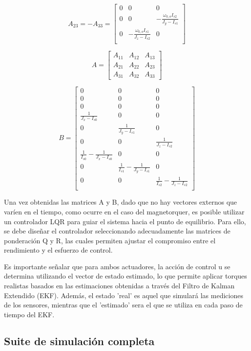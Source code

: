 \[
A_{23} = -A_{33} = 
\begin{bmatrix}
	0 & 0 & 0 \\
	0 & 0 & -\frac{\omega_{0,o} I_{s2}}{J_y - I_{s1}}
	 \\
	0 & -\frac{\omega_{0,o} I_{s1}}{J_z - I_{s2}}
	 & 0 \\
\end{bmatrix}
\]

\[
A =
\begin{bmatrix}
	A_{11} & A_{12} & A_{13} \\
	A_{21} & A_{22} & A_{23} \\
	A_{31} & A_{32} & A_{33}
\end{bmatrix}
\]

\[
B =
\begin{bmatrix}
	0 & 0 & 0 \\
	0 & 0 & 0 \\
	0 & 0 & 0 \\
	\frac{1}{J_{x}-I_{s0}} & 0 & 0 \\
	0 & \frac{1}{J_{y}-I_{s1}} & 0 \\
	0 & 0 & \frac{1}{J_{z}-I_{s2}} \\
	\frac{1}{I_{s0}} - \frac{1}{J_{x}-I_{s0}} & 0 & 0 \\
	0 & \frac{1}{I_{s1}} - \frac{1}{J_{y}-I_{s1}} & 0 \\
	0 & 0 & \frac{1}{I_{s2}} - \frac{1}{J_{z}-I_{s2}} \\
\end{bmatrix}
\]

Una vez obtenidas las matrices A y B, dado que no hay vectores externos que varíen en el tiempo, como ocurre en el caso del magnetorquer, es posible utilizar un controlador LQR para guiar el sistema hacia el punto de equilibrio. Para ello, se debe diseñar el controlador seleccionando adecuadamente las matrices de ponderación Q y R, las cuales permiten ajustar el compromiso entre el rendimiento y el esfuerzo de control.

Es importante señalar que para ambos actuadores, la acción de control u se determina utilizando el vector de estado estimado, lo que permite aplicar torques realistas basados en las estimaciones obtenidas a través del Filtro de Kalman Extendido (EKF). Además, el estado 'real' es aquel que simulará las mediciones de los sensores, mientras que el 'estimado' sera el que se utiliza en cada paso de tiempo del EKF.

\subsection{Suite de simulación completa}

